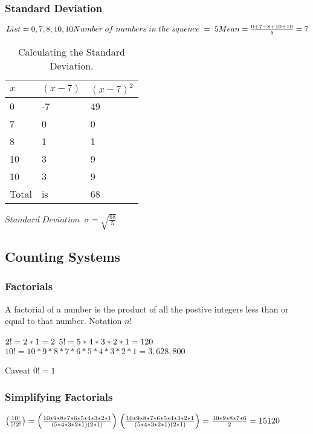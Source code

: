 \documentclass{article}
\begin{document}
\subsubsection{Standard Deviation} 


$\\
List =  0, 7, 8 , 10, 10 
\\
Number\; of\; numbers\; in\; the\; squence\; =\; 5
\\
Mean = \frac{0 + 7 + 8 + 10 + 10}{5} =  7
$

\begin{table}[H]

\begin{tabular}{l|ll}
$x$ & $(x - 7)$ & $(x -7)^{2}$  \\
\hline
0 & -7 & 49  \\
7 & 0 &  0 \\
8 & 1 & 1  \\
10 & 3 & 9  \\
10 & 3 & 9  \\
\hline

Total & is & 68  \\
\end{tabular}

\caption{\label{tab:widgets}Calculating the Standard Deviation.}
\end{table}

$Standard\;Deviation \;\; \sigma = \sqrt{\frac{68}{5}}$

\newpage
\subsection{Counting Systems}
\subsubsection{Factorials}
A factorial of a number is the product of all the postive integers less than or equal to that number.
Notation $n!$

$\\ 2! = 2 * 1 = 2 \\$
$ 5! = 5 * 4 * 3 * 2 * 1 = 120\\ $
$ 10! = 10 * 9 * 8 * 7 * 6 * 5 * 4 * 3 * 2 * 1 = 3,628,800 $

Caveat $0! = 1 $

\subsubsection{Simplifying Factorials}
$\left(\frac{10!}{5!2!}\right) = \left(\frac{10 * 9 * 8 * 7 * 6 * 5 * 4 * 3 * 2 * 1}{(5 * 4 * 3 * 2 * 1)(2 * 1)}\right)\\
\left(\frac{10 * 9 * 8 * 7 * 6 * 5 * 4 * 3 * 2 * 1}{(5 * 4 * 3 * 2 * 1)(2 * 1)}\right) = \frac{10 * 9 * 8 * 7 * 6 }{2} = 15120
$
\end{document}
